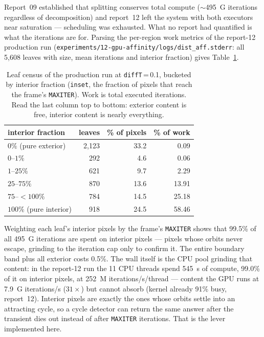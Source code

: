 \documentclass[
	english,
	letterpaper, oneside
]{article}
\begin{document}
Report~09 established that splitting conserves total compute
($\sim$495~G iterations regardless of decomposition) and report~12 left the
system with both executors near saturation --- scheduling was exhausted. What
no report had quantified is what the iterations are for. Parsing the
per-region work metrics of the report-12 production run
(\texttt{experiments/12-gpu-affinity/logs/dist\_aff.stderr}: all 5{,}608
leaves with size, mean iterations and interior fraction) gives
Table~\ref{tab:purity}.

\begin{table}[H]
\centering
\caption{Leaf census of the production run at \texttt{diffT}\,=\,0.1, bucketed
by interior fraction (\texttt{inset}, the fraction of pixels that reach the
frame's \texttt{MAXITER}). Work is total executed iterations. Read the last
column top to bottom: exterior content is free, interior content is nearly
everything.\label{tab:purity}}
\begin{tabular}{lrrr}
\toprule
interior fraction & leaves & \% of pixels & \% of work \\
\midrule
$0\%$ (pure exterior)      & 2{,}123 & 33.2 & 0.09 \\
$0$--$1\%$                 &   292 &  4.6 & 0.06 \\
$1$--$25\%$                &   621 &  9.7 & 2.29 \\
$25$--$75\%$               &   870 & 13.6 & 13.91 \\
$75$--$<100\%$             &   784 & 14.5 & 25.18 \\
$100\%$ (pure interior)    &   918 & 24.5 & 58.46 \\
\bottomrule
\end{tabular}
\end{table}

Weighting each leaf's interior pixels by the frame's \texttt{MAXITER} shows
that 99.5\% of all 495~G iterations are spent on interior pixels ---
pixels whose orbits never escape, grinding to the iteration cap only to
confirm it. The entire boundary band plus all exterior costs 0.5\%. The wall
itself is the CPU pool grinding that content: in the report-12 run the 11 CPU
threads spend 545~s of compute, 99.0\% of it on interior pixels,
at 252~M iterations/s/thread --- content the GPU runs at 7.9~G iterations/s
($31\times$) but cannot absorb (kernel already 91\% busy, report~12). Interior
pixels are exactly the ones whose orbits settle into an attracting cycle, so a
cycle detector can return the same answer after the transient dies out instead
of after \texttt{MAXITER} iterations. That is the lever implemented here.
\end{document}
